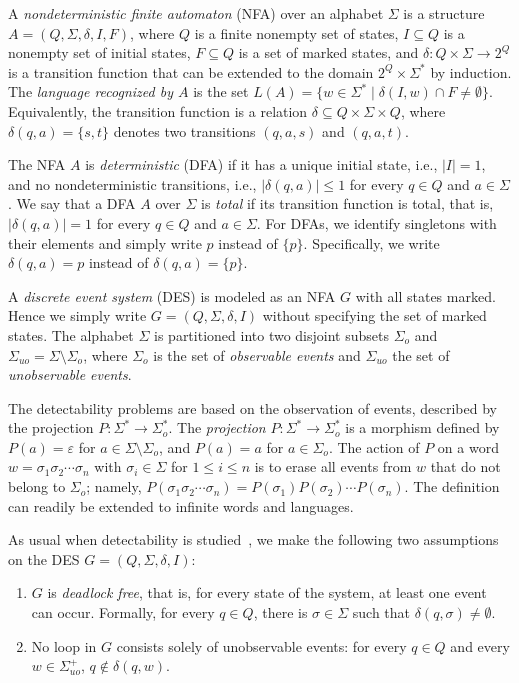 \documentclass[twocolumn,amsthm]{autartx}
\begin{document}
  A {\em nondeterministic finite automaton\/} (NFA) over an alphabet $\Sigma$ is a structure $A = (Q,\Sigma,\delta,I,F)$, where $Q$ is a finite nonempty set of states, $I\subseteq Q$ is a nonempty set of initial states, $F \subseteq Q$ is a set of marked states, and $\delta \colon Q\times\Sigma \to 2^Q$ is a transition function that can be extended to the domain $2^Q\times\Sigma^*$ by induction. The {\em language recognized by $A$\/} is the set $L(A) = \{w\in \Sigma^* \mid \delta(I,w)\cap F \neq\emptyset\}$. Equivalently, the transition function is a relation $\delta \subseteq Q\times \Sigma \times Q$, where $\delta(q,a)=\{s,t\}$ denotes two transitions $(q,a,s)$ and $(q,a,t)$.

  The NFA $A$ is {\em deterministic\/} (DFA) if it has a unique initial state, i.e., $|I|=1$, and no nondeterministic transitions, i.e., $|\delta(q,a)|\le 1$ for every $q\in Q$ and $a \in \Sigma$. We say that a DFA $A$ over $\Sigma$ is {\em total\/} if its transition function is total, that is, $|\delta(q,a)|=1$ for every $q\in Q$ and $a\in\Sigma$. For DFAs, we identify singletons with their elements and simply write $p$ instead of $\{p\}$. Specifically, we write $\delta(q,a)=p$ instead of $\delta(q,a)=\{p\}$.

  A {\em discrete event system\/} (DES) is modeled as an NFA $G$ with all states marked. Hence we simply write $G=(Q,\Sigma,\delta,I)$ without specifying the set of marked states. The alphabet $\Sigma$ is partitioned into two disjoint subsets $\Sigma_o$ and $\Sigma_{uo}=\Sigma\setminus\Sigma_o$, where $\Sigma_o$ is the set of {\em observable events\/} and $\Sigma_{uo}$ the set of {\em unobservable events}. 
  
  The detectability problems are based on the observation of events, described by the projection $P\colon \Sigma^* \to \Sigma_o^*$. The {\em projection} $P\colon \Sigma^* \to \Sigma_o^*$ is a morphism defined by $P(a) = \varepsilon$ for $a\in \Sigma\setminus \Sigma_o$, and $P(a)= a$ for $a\in \Sigma_o$. The action of $P$ on a word $w=\sigma_1\sigma_2\cdots\sigma_n$ with $\sigma_i \in \Sigma$ for $1\le i\le n$ is to erase all events from $w$ that do not belong to $\Sigma_o$; namely, $P(\sigma_1\sigma_2\cdots\sigma_n)=P(\sigma_1) P(\sigma_2) \cdots P(\sigma_n)$. The definition can readily be extended to infinite words and languages.
  
  As usual when detectability is studied~\cite{ShuLin2011}, we make the following two assumptions on the DES $G=(Q,\Sigma,\delta,I)$:
  \begin{enumerate}
    \item\label{deadlock-free} $G$ is {\em deadlock free}, that is, for every state of the system, at least one event can occur. Formally, for every $q\in Q$, there is $\sigma \in \Sigma$ such that $\delta(q,\sigma)\neq\emptyset$.
  
    \item No loop in $G$ consists solely of unobservable events: for every $q\in Q$ and every $w \in \Sigma_{uo}^+$, $q\notin \delta(q,w)$.
  \end{enumerate}
\end{document}
